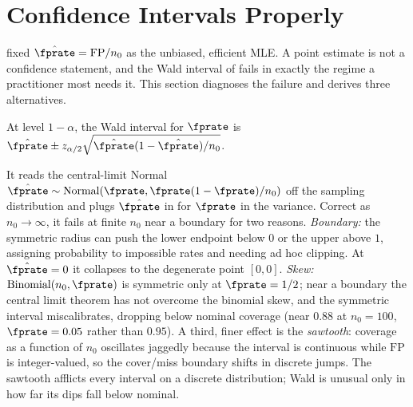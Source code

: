%

\section{Confidence Intervals Properly}
\label{sec:confidence-intervals}

 fixed $\hat{\fprate} = \mathrm{FP}/n_0$ as the
unbiased, efficient MLE. A point estimate is not a confidence
statement, and
the Wald interval of  fails in exactly the regime a
practitioner most needs it. This section diagnoses the failure and derives
three alternatives.

\begin{definition}
\label{def:wald-ci}
At level $1 - \alpha$, the Wald interval for $\fprate$ is $\hat{\fprate} \pm
z_{\alpha/2}\sqrt{\hat{\fprate}(1 - \hat{\fprate})/n_0}$.
\end{definition}

It reads the central-limit Normal $\hat{\fprate} \sim \mathrm{Normal}(\fprate,
\fprate(1 - \fprate)/n_0)$ off the sampling distribution and plugs
$\hat{\fprate}$ in for $\fprate$ in the variance. Correct as $n_0 \to \infty$,
it fails at finite $n_0$ near a boundary for two reasons. \emph{Boundary:} the
symmetric radius can push the lower endpoint below $0$ or the upper above $1$,
assigning probability to impossible rates and needing ad hoc clipping. At
$\hat{\fprate} = 0$ it collapses to the degenerate point $[0,0]$.
\emph{Skew:} $\mathrm{Binomial}(n_0, \fprate)$ is symmetric only at $\fprate =
1/2$; near a boundary the central limit theorem has not overcome the binomial
skew, and the symmetric interval miscalibrates, dropping below nominal
coverage (near $0.88$ at $n_0 = 100$, $\fprate = 0.05$ rather than $0.95$).
A third, finer effect is the \emph{sawtooth}: coverage as a function of $n_0$
oscillates jaggedly because the interval is continuous while $\mathrm{FP}$ is
integer-valued, so the cover/miss boundary shifts in discrete jumps. The
sawtooth afflicts every interval on a discrete distribution; Wald is unusual
only in how far its dips fall below nominal.

